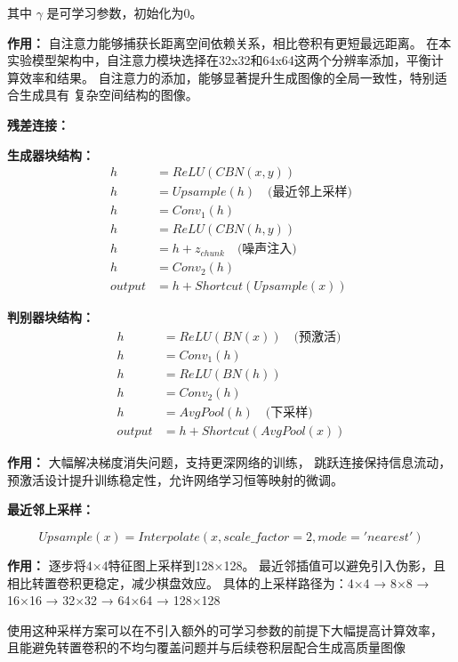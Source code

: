 \documentclass[12pt, a4paper]{article}
\begin{document}
其中 $\gamma$ 是可学习参数，初始化为0。


\textbf{作用：}
自注意力能够捕获长距离空间依赖关系，相比卷积有更短最远距离。
在本实验模型架构中，自注意力模块选择在32x32和64x64这两个分辨率添加，平衡计算效率和结果。
自注意力的添加，能够显著提升生成图像的全局一致性，特别适合生成具有
复杂空间结构的图像。

\vspace{1cm}

\begin{center}
    \textbf{残差连接：}
\end{center}

\textbf{生成器块结构：}
\begin{align}
h &= ReLU(CBN(x, y)) \\
h &= Upsample(h) \quad \text{(最近邻上采样)} \\
h &= Conv_1(h) \\
h &= ReLU(CBN(h, y)) \\
h &= h + z_{chunk} \quad \text{(噪声注入)} \\
h &= Conv_2(h) \\
output &= h + Shortcut(Upsample(x))
\end{align}

\textbf{判别器块结构：}
\begin{align}
h &= ReLU(BN(x)) \quad \text{(预激活)} \\
h &= Conv_1(h) \\
h &= ReLU(BN(h)) \\
h &= Conv_2(h) \\
h &= AvgPool(h) \quad \text{(下采样)} \\
output &= h + Shortcut(AvgPool(x))
\end{align}

\textbf{作用：}
大幅解决梯度消失问题，支持更深网络的训练，
跳跃连接保持信息流动，预激活设计提升训练稳定性，允许网络学习恒等映射的微调。



\begin{center}
\textbf{最近邻上采样：}
\end{center}
$$Upsample(x) = Interpolate(x, scale\_factor=2, mode='nearest')$$

\textbf{作用：}
逐步将4×4特征图上采样到128×128。
最近邻插值可以避免引入伪影，且相比转置卷积更稳定，减少棋盘效应。
具体的上采样路径为：4×4 → 8×8 → 16×16 → 32×32 → 64×64 → 128×128

使用这种采样方案可以在不引入额外的可学习参数的前提下大幅提高计算效率，
且能避免转置卷积的不均匀覆盖问题并与后续卷积层配合生成高质量图像
\end{document}
